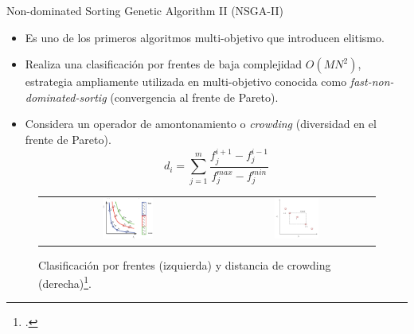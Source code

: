 \documentclass{beamer}
\begin{document}
\begin{frame}{Non-dominated Sorting Genetic Algorithm II (NSGA-II)}
\begin{itemize}
\scriptsize
\item Es uno de los primeros algoritmos multi-objetivo que introducen elitismo.
\item Realiza una clasificación por frentes de baja complejidad $O(MN^2)$, estrategia ampliamente utilizada en multi-objetivo conocida como \textit{fast-non-dominated-sortig} (convergencia al frente de Pareto).
\item Considera un operador de amontonamiento o \textit{crowding} (diversidad en el frente de Pareto).
\begin{equation*}
   d_i = \sum_{j=1}^m \frac{f_j^{i+1} - f_j^{i-1}   }{f_j^{max} - f_j^{min}}
\end{equation*}
\end{itemize}

\begin{figure}[H]
\centering
\begin{tabular}{c c}
\includegraphics[width=0.3\textwidth]{fronts.png} & \includegraphics[width=0.3\textwidth]{crowding_nsgaii.jpg} 
\end{tabular}
\caption{\scriptsize Clasificación por frentes (izquierda) y distancia de crowding (derecha)\footcite{kadlec2016multi}.}
\end{figure}
\end{frame}
\end{document}
